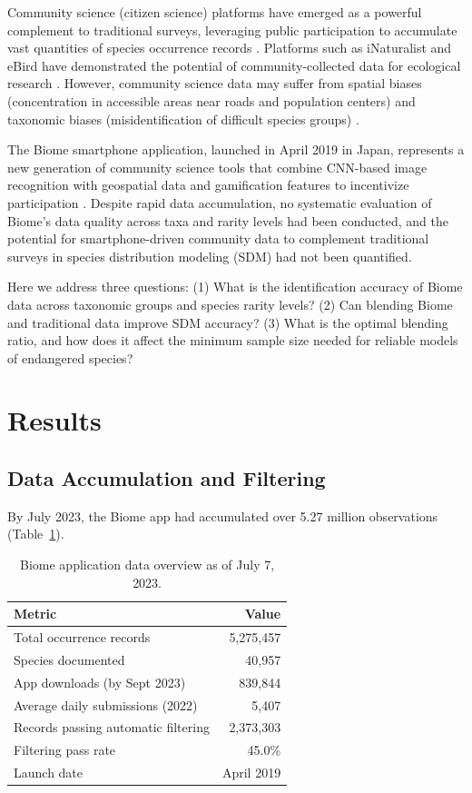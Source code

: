 \documentclass[11pt]{article}
\begin{document}
Community science (citizen science) platforms have emerged as a powerful complement to traditional surveys, leveraging public participation to accumulate vast quantities of species occurrence records \citep{dickinson2010citizen, bonney2009citizen}. Platforms such as iNaturalist and eBird have demonstrated the potential of community-collected data for ecological research \citep{sullivan2009ebird, loarie2016inaturalist}. However, community science data may suffer from spatial biases (concentration in accessible areas near roads and population centers) and taxonomic biases (misidentification of difficult species groups) \citep{beck2014spatial, geldmann2016determines, kosmala2016assessing}.

The Biome smartphone application, launched in April 2019 in Japan, represents a new generation of community science tools that combine CNN-based image recognition with geospatial data and gamification features to incentivize participation \citep{lecun2015deep}. Despite rapid data accumulation, no systematic evaluation of Biome's data quality across taxa and rarity levels had been conducted, and the potential for smartphone-driven community data to complement traditional surveys in species distribution modeling (SDM) had not been quantified.

Here we address three questions: (1) What is the identification accuracy of Biome data across taxonomic groups and species rarity levels? (2) Can blending Biome and traditional data improve SDM accuracy? (3) What is the optimal blending ratio, and how does it affect the minimum sample size needed for reliable models of endangered species?

\section{Results}

\subsection{Data Accumulation and Filtering}

By July 2023, the Biome app had accumulated over 5.27 million observations (Table~\ref{tab:overview}).

\begin{table}[H]
\centering
\caption{Biome application data overview as of July 7, 2023.}
\label{tab:overview}
\begin{tabular}{lr}
\toprule
\textbf{Metric} & \textbf{Value} \\
\midrule
Total occurrence records & 5,275,457 \\
Species documented & 40,957 \\
App downloads (by Sept 2023) & 839,844 \\
Average daily submissions (2022) & 5,407 \\
Records passing automatic filtering & 2,373,303 \\
Filtering pass rate & 45.0\% \\
Launch date & April 2019 \\
\bottomrule
\end{tabular}
\end{table}
\end{document}
